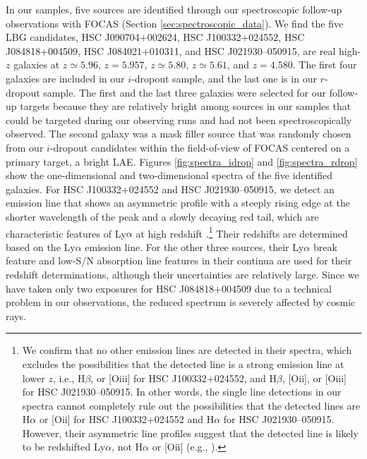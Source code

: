 \documentclass[]{pasj01}
\begin{document}
In our samples, 
five sources are identified 
through our spectroscopic follow-up observations with FOCAS 
(Section \ref{sec:spectroscopic_data}).   
We find the five LBG candidates, 
HSC J090704+002624, 
HSC J100332+024552, 
HSC J084818+004509, 
HSC J084021+010311, 
and HSC J021930--050915, 
are real high-$z$ galaxies at 
$z \simeq 5.96$, 
$z = 5.957$, 
$z \simeq 5.80$, 
$z \simeq 5.61$, 
and $z = 4.580$. 
The first four galaxies are included in our $i$-dropout sample, 
and the last one is in our $r$-dropout sample. 
The first and the last three galaxies were selected for our follow-up targets 
because they are relatively bright among sources in our samples 
that could be targeted during 
our observing runs and had not been spectroscopically observed. 
The second galaxy was a mask filler source 
that was randomly chosen 
from our $i$-dropout candidates within the field-of-view of FOCAS 
centered on a primary target, a bright LAE. 
Figures \ref{fig:spectra_idrop} and \ref {fig:spectra_rdrop} 
show the one-dimensional and two-dimensional spectra 
of the five identified galaxies.
For HSC J100332+024552 and HSC J021930--050915, 
we detect an emission line that shows 
an asymmetric profile with a steeply rising edge at the shorter wavelength of the peak  
and a slowly decaying red tail, which are characteristic features of Ly$\alpha$ 
at high redshift \citep{2006ApJ...648....7K,2006PASJ...58..313S}.\footnote{We confirm that 
no other emission lines are detected in their spectra, 
which excludes the possibilities that 
the detected line is 
a strong emission line at lower $z$, 
i.e., H$\beta$, or [{\sc Oiii}] for HSC J100332+024552, 
and 
H$\beta$, [{\sc Oii}], or [{\sc Oiii}] for HSC J021930--050915.  
In other words, 
the single line detections in our spectra  
cannot completely rule out the possibilities that 
the detected lines are 
H$\alpha$ or [{\sc Oii}] for HSC J100332+024552 
and 
H$\alpha$ for HSC J021930--050915. 
However, 
their asymmetric line profiles suggest that 
the detected line is likely to be redshifted Ly$\alpha$, 
not H$\alpha$ or [{\sc Oii}] (e.g., \cite{2006ApJ...648....7K,2006PASJ...58..313S}). 
}
Their redshifts are determined based on the Ly$\alpha$ emission line. 
For the other three sources,  
their Ly$\alpha$ break feature 
and low-S/N absorption line features in their continua 
are used for their redshift determinations,
although their uncertainties are relatively large.  
Since we have taken only two exposures for HSC J084818+004509 
due to a technical problem in our observations, 
the reduced spectrum is severely affected by cosmic rays. 
\end{document}
